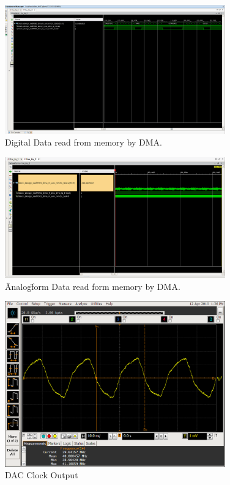 \begin{figure}[htbp]
    \centering
    \includegraphics[width=0.85\textwidth]{./figures/ila_dataflow}
    \caption{ Digital Data read from memory by DMA.
    \label{fig:dataflowdig}}
\end{figure}

\begin{figure}[htbp]
    \centering
    \includegraphics[width=0.85\textwidth]{./figures/ltedac_ila}
    \caption{ \"Analog\" form Data read form memory by DMA.
    \label{fig:dataflowana}}
\end{figure}

\begin{figure}[htbp]
    \centering
    \includegraphics[width=0.85\textwidth]{./figures/oscill_ad9361_dac_clk}
    \caption{ DAC Clock Output
    \label{fig:dacclk}}
\end{figure}

